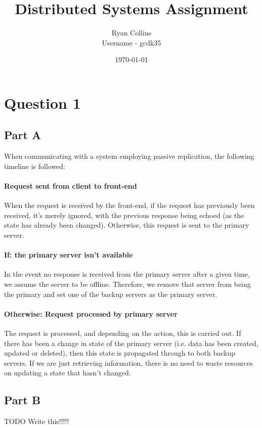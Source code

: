 \documentclass[12pt,fleqn,leqno,letterpaper]{article}
\title{Distributed Systems Assignment}
\author{Ryan Collins\\
  \small{Username - gcdk35}\\
}
\date{\today}
\begin{document}
\maketitle

\section*{Question 1}
\subsection*{Part A}
When communicating with a system employing passive replication, the following timeline is followed:

\paragraph{Request sent from client to front-end}
When the request is received by the front-end, if the request has previously been received, it's merely ignored, with the previous response being echoed (as the state has already been changed). Otherwise, this request is sent to the primary server.

\paragraph{If: the primary server isn't available}
In the event no response is received from the primary server after a given time, we assume the server to be offline. Therefore, we remove that server from being the primary and set one of the backup servers as the primary server.

\paragraph{Otherwise: Request processed by primary server}
The request is processed, and depending on the action, this is carried out. If there has been a change in state of the primary server (i.e. data has been created, updated or deleted), then this state is propagated through to both backup servers. If we are just retrieving information, there is no need to waste resources on updating a state that hasn't changed.

\subsection*{Part B}
TODO Write this!!!!!
\end{document}

